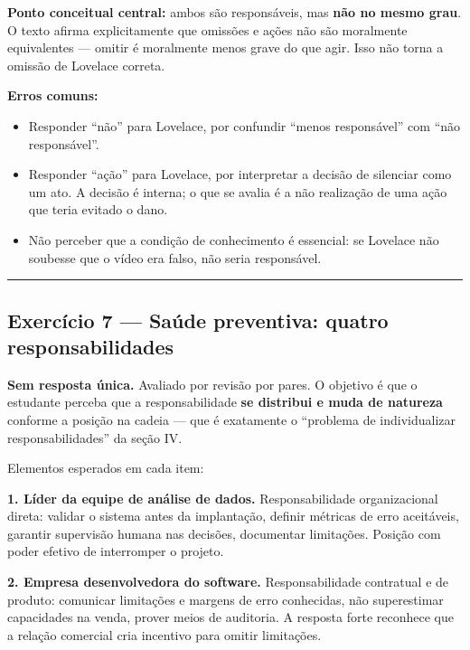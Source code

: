 \documentclass[
  11pt,
]{article}
\providecommand{\tightlist}{%
  \setlength{\itemsep}{0pt}\setlength{\parskip}{0pt}}
\begin{document}
\textbf{Ponto conceitual central:} ambos são responsáveis, mas
\textbf{não no mesmo grau}. O texto afirma explicitamente que omissões e
ações não são moralmente equivalentes --- omitir é moralmente menos
grave do que agir. Isso não torna a omissão de Lovelace correta.

\textbf{Erros comuns:}

\begin{itemize}
\tightlist
\item
  Responder ``não'' para Lovelace, por confundir ``menos responsável''
  com ``não responsável''.
\item
  Responder ``ação'' para Lovelace, por interpretar a decisão de
  silenciar como um ato. A decisão é interna; o que se avalia é a não
  realização de uma ação que teria evitado o dano.
\item
  Não perceber que a condição de conhecimento é essencial: se Lovelace
  não soubesse que o vídeo era falso, não seria responsável.
\end{itemize}

\begin{center}\rule{0.5\linewidth}{0.5pt}\end{center}

\hypertarget{exercuxedcio-7-sauxfade-preventiva-quatro-responsabilidades}{%
\subsection{Exercício 7 --- Saúde preventiva: quatro
responsabilidades}\label{exercuxedcio-7-sauxfade-preventiva-quatro-responsabilidades}}

\textbf{Sem resposta única.} Avaliado por revisão por pares. O objetivo
é que o estudante perceba que a responsabilidade \textbf{se distribui e
muda de natureza} conforme a posição na cadeia --- que é exatamente o
``problema de individualizar responsabilidades'' da seção IV.

Elementos esperados em cada item:

\textbf{1. Líder da equipe de análise de dados.} Responsabilidade
organizacional direta: validar o sistema antes da implantação, definir
métricas de erro aceitáveis, garantir supervisão humana nas decisões,
documentar limitações. Posição com poder efetivo de interromper o
projeto.

\textbf{2. Empresa desenvolvedora do software.} Responsabilidade
contratual e de produto: comunicar limitações e margens de erro
conhecidas, não superestimar capacidades na venda, prover meios de
auditoria. A resposta forte reconhece que a relação comercial cria
incentivo para omitir limitações.
\end{document}
